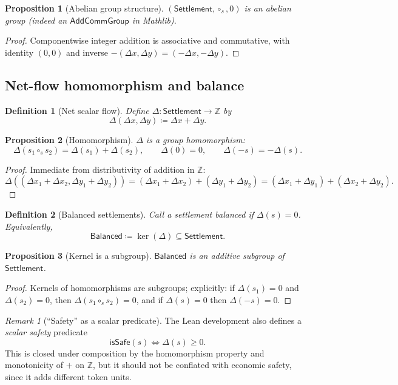 \documentclass[11pt]{article}
\newtheorem{definition}{Definition}
\newtheorem{proposition}{Proposition}
\theoremstyle{remark}
\newtheorem{remark}{Remark}
\newcommand{\Z}{\mathbb{Z}}
\begin{document}
\begin{proposition}[Abelian group structure]
$(\mathsf{Settlement}, \circ_s, 0)$ is an abelian group (indeed an $\mathsf{AddCommGroup}$ in Mathlib).
\end{proposition}
\begin{proof}
Componentwise integer addition is associative and commutative, with identity $(0,0)$ and inverse $-(\Delta x,\Delta y)=(-\Delta x,-\Delta y)$.
\end{proof}

\subsection{Net-flow homomorphism and balance}

\begin{definition}[Net scalar flow]
Define $\Delta : \mathsf{Settlement}\to\Z$ by
\[
  \Delta(\Delta x,\Delta y) \coloneqq \Delta x + \Delta y.
\]
\end{definition}

\begin{proposition}[Homomorphism]
$\Delta$ is a group homomorphism:
\[
  \Delta(s_1 \circ_s s_2) = \Delta(s_1) + \Delta(s_2), \qquad
  \Delta(0)=0,\qquad
  \Delta(-s) = -\Delta(s).
\]
\end{proposition}
\begin{proof}
Immediate from distributivity of addition in $\Z$:
\[
  \Delta((\Delta x_1+\Delta x_2,\Delta y_1+\Delta y_2))
  = (\Delta x_1+\Delta x_2)+(\Delta y_1+\Delta y_2)
  = (\Delta x_1+\Delta y_1) + (\Delta x_2+\Delta y_2).
\]
\end{proof}

\begin{definition}[Balanced settlements]
Call a settlement \emph{balanced} if $\Delta(s)=0$.
Equivalently,
\[
  \mathsf{Balanced} \coloneqq \ker(\Delta) \subseteq \mathsf{Settlement}.
\]
\end{definition}

\begin{proposition}[Kernel is a subgroup]
$\mathsf{Balanced}$ is an additive subgroup of $\mathsf{Settlement}$.
\end{proposition}
\begin{proof}
Kernels of homomorphisms are subgroups; explicitly:
if $\Delta(s_1)=0$ and $\Delta(s_2)=0$, then $\Delta(s_1\circ_s s_2)=0$,
and if $\Delta(s)=0$ then $\Delta(-s)=0$.
\end{proof}

\begin{remark}[``Safety'' as a scalar predicate]
The Lean development also defines a \emph{scalar safety} predicate
\[
  \mathsf{isSafe}(s) \iff \Delta(s) \ge 0.
\]
This is closed under composition by the homomorphism property and monotonicity of $+$ on $\Z$,
but it should not be conflated with economic safety, since it adds different token units.
\end{remark}
\end{document}
